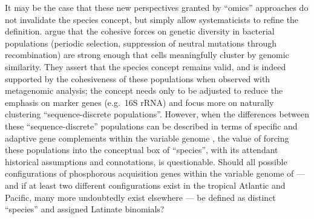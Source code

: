 It may be the case that these new perspectives granted by ``omics'' approaches do not invalidate the species concept, but simply allow systematicists to refine the definition.
\citet{CaroQuintero:2011jv} argue that the cohesive forces on genetic diversity in bacterial populations (periodic selection, suppression of neutral mutations through recombination) are strong enough that cells meaningfully cluster by genomic similarity.
They assert that the species concept remains valid, and is indeed supported by the cohesiveness of these populations when observed with metagenomic analysis; the concept needs only to be adjusted to reduce the emphasis on marker genes (e.g.\ 16S rRNA) and focus more on naturally clustering ``sequence-discrete populations''.
However, when the differences between these ``sequence-discrete'' populations can be described in terms of specific and adaptive gene complements within the variable genome \citep[as in][]{Coleman:2010jj}, the value of forcing these populations into the conceptual box of ``species'', with its attendant historical assumptions and connotations, is questionable.
Should all possible configurations of phosphorous acquisition genes within the variable genome of  --- and if at least two different configurations exist in the tropical Atlantic and Pacific, many more undoubtedly exist elsewhere --- be defined as distinct ``species'' and assigned Latinate binomials?


